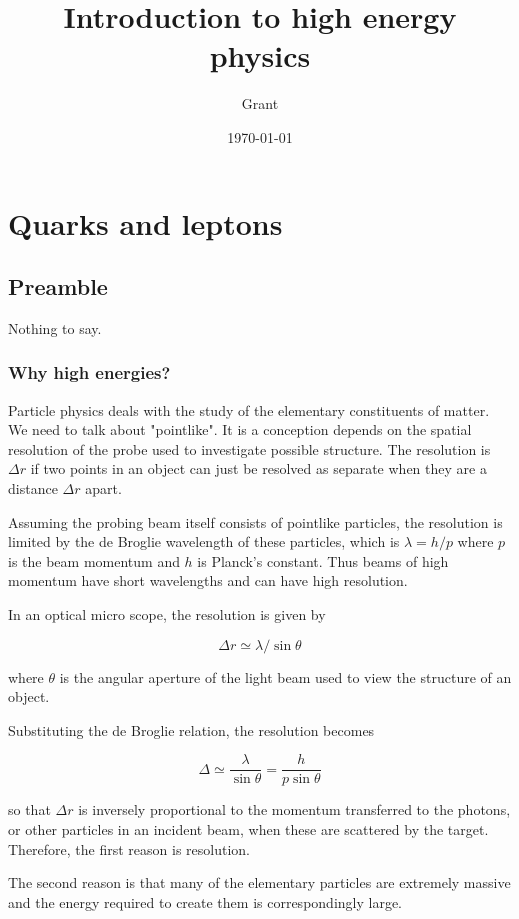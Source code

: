 \documentclass[en, device=normal]{elegantnote}
\title{Introduction to high energy physics}
\author{Grant}
\date{\today}
\begin{document}
\maketitle

\section{Quarks and leptons}

\thispagestyle{empty}

\subsection{Preamble}

Nothing to say.

\subsubsection{Why high energies?}

Particle physics deals with the study of the elementary constituents of matter.
We need to talk about "pointlike". It is a conception depends on the spatial resolution 
of the probe used to investigate possible structure. The resolution is $\Delta r$ if 
two points in an object can just be resolved as separate when they are a distance $\Delta r$ 
apart.

Assuming the probing beam itself consists of pointlike particles, the resolution is limited by 
the de Broglie wavelength of these particles, which is $\lambda = h/p$ where $p$ is the 
beam momentum and $h$ is Planck's constant. Thus beams of high momentum have short 
wavelengths and can have high resolution.

In an optical micro scope, the resolution is given by

$$\Delta r\simeq\lambda/ \sin\theta$$

where $\theta$ is the angular aperture of the light beam used to view the structure of 
an object.

Substituting the de Broglie relation, the resolution becomes 

$$\Delta\simeq\frac{\lambda}{\sin\theta}=\frac{h}{p\sin\theta}$$

so that $\Delta r$ is inversely proportional to the momentum transferred to the photons, 
or other particles in an incident beam, when these are scattered by the target. Therefore, 
the first reason is resolution.

The second reason is that many of the elementary particles are extremely massive and the 
energy required to create them is correspondingly large.
\end{document}
